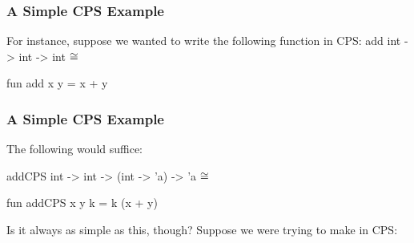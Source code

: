 \documentclass[aspectratio=169]{beamer}
\begin{document}

\begin{frame}[fragile]
  \frametitle{A Simple CPS Example}

  For instance, suppose we wanted to write the following function in CPS:
  \spec
    {add}
    {int -> int -> int}
    {}
    { $\cong$ }

  \pause
  \vspace{\fill}

  \begin{codeblock}
    fun add x y = x + y
  \end{codeblock}
\end{frame}

\begin{frame}[fragile]
  \frametitle{A Simple CPS Example}

  The following would suffice:

  \spec
    {addCPS}
    {int -> int -> (int -> 'a) -> 'a}
    {}
    { $\cong$ }

  \pause
  \vspace{\fill}

  \begin{codeblock}
    fun addCPS x y k = k (x + y)
  \end{codeblock}

  \pause
  \vspace{\fill}

  Is it always as simple as this, though? Suppose we were trying to
  make  in CPS:
\end{frame}
\end{document}
